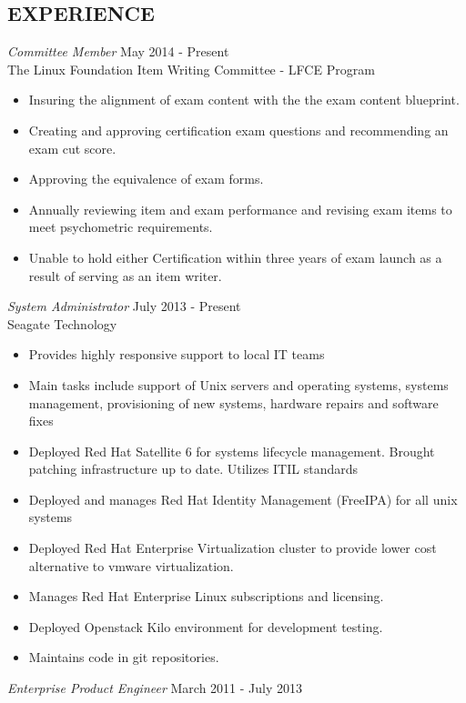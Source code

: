\documentclass[margin]{res}
\begin{document}
\begin{resume}
\section{EXPERIENCE}
	{\sl Committee Member} \hfill May 2014 - Present \\
    The Linux Foundation Item Writing Committee - LFCE Program
    \begin{itemize}  \itemsep -2pt %
    \item Insuring the alignment of exam content with the the exam content blueprint.
    \item Creating and approving certification exam questions and recommending an exam cut score.
    \item Approving the equivalence of exam forms.
    \item Annually reviewing item and exam performance and revising exam items to meet psychometric requirements.
    \item Unable to hold either Certification within three years of exam launch as a result of serving as an item writer.
    \end{itemize}
	{\sl System Administrator} \hfill July 2013 - Present \\
	Seagate Technology
	\begin{itemize}  \itemsep -2pt %
		\item Provides highly responsive support to local IT teams
		\item Main tasks include support of Unix servers and operating systems, systems management, provisioning of new systems, hardware repairs and software fixes
		\item Deployed Red Hat Satellite 6 for systems lifecycle management. Brought patching infrastructure up to date. Utilizes ITIL standards
		\item Deployed and manages Red Hat Identity Management (FreeIPA) for all unix systems
		\item Deployed Red Hat Enterprise Virtualization cluster to provide lower cost alternative to vmware virtualization.
		\item Manages Red Hat Enterprise Linux subscriptions and licensing.
		\item Deployed Openstack Kilo environment for development testing.
		\item Maintains code in git repositories.
	\end{itemize}
 	{\sl Enterprise Product Engineer} \hfill March 2011 - July 2013 \\

\end{resume}
\end{document}
